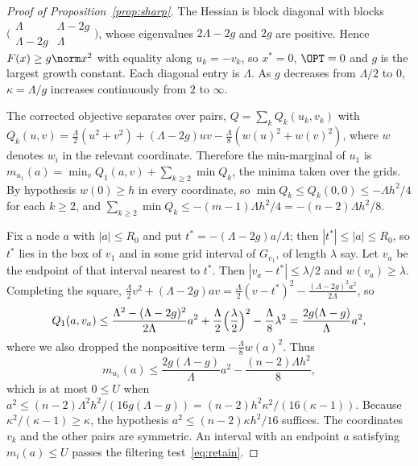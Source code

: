 \begin{proof}[Proof of Proposition~\ref{prop:sharp}]
The Hessian is block diagonal with blocks
$\bigl(\begin{smallmatrix}\Lambda&\Lambda-2g\\\Lambda-2g&\Lambda\end{smallmatrix}\bigr)$,
whose eigenvalues $2\Lambda-2g$ and $2g$ are positive. Hence
$F(x)\ge g\norm x^2$ with equality along $u_k=-v_k$, so $x^*=0$, $\OPT=0$ and
$g$ is the largest growth constant. Each diagonal entry is $\Lambda$. As $g$
decreases from $\Lambda/2$ to $0$, $\kappa=\Lambda/g$ increases continuously
from $2$ to $\infty$.

The corrected objective separates over pairs, $Q=\sum_kQ_k(u_k,v_k)$ with
$Q_k(u,v)=\frac\Lambda2(u^2+v^2)+(\Lambda-2g)uv-\frac\Lambda8(w(u)^2+w(v)^2)$,
where $w$ denotes $w_i$ in the relevant coordinate. Therefore the min-marginal
of $u_1$ is $m_{u_1}(a)=\min_vQ_1(a,v)+\sum_{k\ge2}\min Q_k$, the minima taken
over the grids. By hypothesis $w(0)\ge h$ in every coordinate, so
$\min Q_k\le Q_k(0,0)\le-\Lambda h^2/4$ for each $k\ge2$, and
$\sum_{k\ge2}\min Q_k\le-(m-1)\Lambda h^2/4=-(n-2)\Lambda h^2/8$.

Fix a node $a$ with $|a|\le R_0$ and put $t^*=-(\Lambda-2g)a/\Lambda$; then
$|t^*|\le|a|\le R_0$, so $t^*$ lies in the box of $v_1$ and in some grid
interval of $G_{v_1}$, of length $\lambda$ say. Let $v_a$ be the endpoint of
that interval nearest to $t^*$. Then $|v_a-t^*|\le\lambda/2$ and
$w(v_a)\ge\lambda$. Completing the square,
$\frac\Lambda2v^2+(\Lambda-2g)av=\frac\Lambda2(v-t^*)^2
-\frac{(\Lambda-2g)^2a^2}{2\Lambda}$, so
\[
Q_1(a,v_a)\le\frac{\Lambda^2-(\Lambda-2g)^2}{2\Lambda}a^2
+\frac\Lambda2\Bigl(\frac\lambda2\Bigr)^2-\frac\Lambda8\lambda^2
=\frac{2g(\Lambda-g)}{\Lambda}a^2 ,
\]
where we also dropped the nonpositive term $-\frac\Lambda8w(a)^2$. Thus
\[
m_{u_1}(a)\le\frac{2g(\Lambda-g)}{\Lambda}a^2-\frac{(n-2)\Lambda h^2}8,
\]
which is at most $0\le U$ when
$a^2\le(n-2)\Lambda^2h^2/(16g(\Lambda-g))=(n-2)h^2\kappa^2/(16(\kappa-1))$.
Because $\kappa^2/(\kappa-1)\ge\kappa$, the hypothesis
$a^2\le(n-2)\kappa h^2/16$ suffices. The coordinates $v_k$ and the other
pairs are symmetric. An interval with an endpoint $a$ satisfying
$m_i(a)\le U$ passes the filtering test~\eqref{eq:retain}.
\end{proof}

